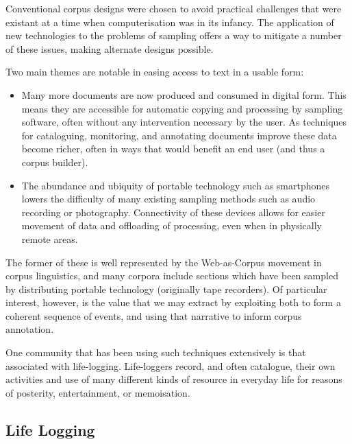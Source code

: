 Conventional corpus designs were chosen to avoid practical challenges that were existant at a time when computerisation was in its infancy.  The application of new technologies to the problems of sampling offers a way to mitigate a number of these issues, making alternate designs possible.

Two main themes are notable in easing access to text in a usable form:

\begin{itemize}
    \item Many more documents are now produced and consumed in digital form.  This means they are accessible for automatic copying and processing by sampling software, often without any intervention necessary by the user.  As techniques for cataloguing, monitoring, and annotating documents improve these data become richer, often in ways that would benefit an end user (and thus a corpus builder).
    \item The abundance and ubiquity of portable technology such as smartphones lowers the difficulty of many existing sampling methods such as audio recording or photography.  Connectivity of these devices allows for easier movement of data and offloading of processing, even when in physically remote areas.
\end{itemize}


The former of these is well represented by the Web-as-Corpus movement in corpus linguistics, and many corpora include sections which have been sampled by distributing portable technology (originally tape recorders).  Of particular interest, however, is the value that we may extract by exploiting both to form a coherent sequence of events, and using that narrative to inform corpus annotation.

One community that has been using such techniques extensively is that associated with life-logging.  Life-loggers record, and often catalogue, their own activities and use of many different kinds of resource in everyday life for reasons of posterity, entertainment, or memoisation.










\subsection{Life Logging}

